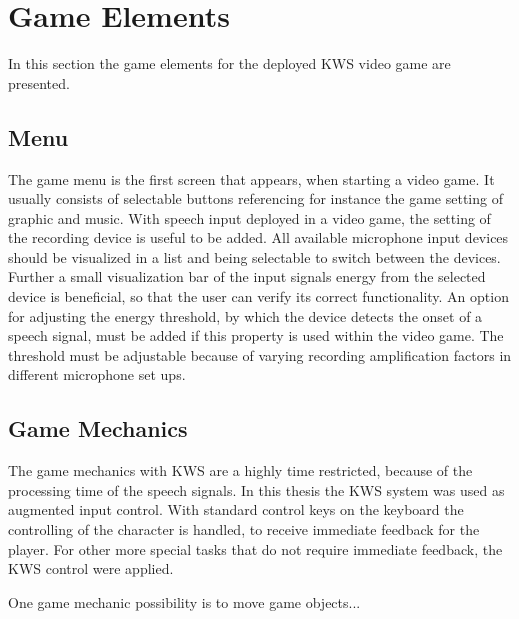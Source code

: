 
\section{Game Elements}
\thesisStateNotReady
In this section the game elements for the deployed KWS video game are presented.



\subsection{Menu}\label{sec:game_interactables_menu}
The game menu is the first screen that appears, when starting a video game. 
It usually consists of selectable buttons referencing for instance the game setting of graphic and music.
With speech input deployed in a video game, the setting of the recording device is useful to be added.
All available microphone input devices should be visualized in a list and being selectable to switch between the devices.
Further a small visualization bar of the input signals energy from the selected device is beneficial, so that the user can verify its correct functionality.
An option for adjusting the energy threshold, by which the device detects the onset of a speech signal, must be added if this property is used within the video game.
The threshold must be adjustable because of varying recording amplification factors in different microphone set ups.



\subsection{Game Mechanics}
The game mechanics with KWS are a highly time restricted, because of the processing time of the speech signals.
In this thesis the KWS system was used as augmented input control.
With standard control keys on the keyboard the controlling of the character is handled, to receive immediate feedback for the player. 
For other more special tasks that do not require immediate feedback, the KWS control were applied.

One game mechanic possibility is to move game objects... 



